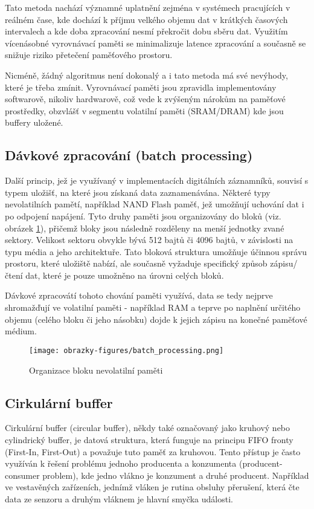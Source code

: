 Tato metoda nachází významné uplatnění zejména v systémech pracujících v reálném čase, kde dochází k příjmu velkého objemu dat 
v krátkých časových intervalech a kde doba zpracování nesmí překročit dobu sběru dat. Využitím vícenásobné vyrovnávací paměti se 
minimalizuje latence zpracování a současně se snižuje riziko přetečení paměťového prostoru. \cite{buffering_chang}

Nicméně, žádný algoritmus není dokonalý a i tato metoda má své nevýhody, které je třeba zmínit. Vyrovnávací paměti jsou zpravidla 
implementovány softwarově, nikoliv hardwarově, což vede k zvýšeným nárokům na paměťové prostředky, obzvlášť v segmentu volatilní 
paměti (SRAM/DRAM) kde jsou buffery uložené. \cite{basics_of_digital_forensics}

\subsection{Dávkové zpracování (batch processing)}
Další princip, jež je využívaný v implementacích digitálních záznamníků, souvisí s typem uložišť, na které jsou získaná data 
zaznamenávána. Některé typy nevolatilních pamětí, například NAND Flash paměť, jež umožňují uchování dat i po odpojení napájení. 
Tyto druhy paměti jsou organizovány do bloků (viz. obrázek \ref{fig:batch-processing}), přičemž bloky jsou následně rozděleny na 
menší jednotky zvané sektory. Velikost sektoru obvykle bývá 512 bajtů či 4096 bajtů, v závislosti na typu média a jeho architektuře. Tato bloková struktura umožňuje účinnou správu prostoru, které uložiště nabízí, ale současně vyžaduje specifický způsob zápisu/čtení dat, které je pouze umožněno na úrovni celých bloků.  \cite{tech_target_nand_flash, non_volatile_memories}

Dávkové zpracovátí tohoto chování paměti využívá, data se tedy nejprve shromažďují ve volatilní paměti - například RAM a teprve po 
naplnění určitého objemu (celého bloku či jeho násobku) dojde k jejich zápisu na konečné paměťové médium.

\begin{figure}[h]
    \centering
    \texttt{[image: obrazky-figures/batch\_processing.png]}
    
    \caption{Organizace bloku nevolatilní paměti \cite{ieee_relationships_among_region_segment_frame_and_cluster}}
    \label{fig:batch-processing}
\end{figure}


\subsection{Cirkulární buffer}
Cirkulární buffer (circular buffer), někdy také označovaný jako kruhový nebo cylindrický buffer, je datová struktura, která 
funguje na principu FIFO fronty (First-In, First-Out) a považuje tuto paměť za kruhovou. Tento přístup je často využíván k řešení 
problému jednoho producenta a konzumenta (producent-consumer problem), kde jedno vlákno je konzument a druhé producent. Například 
ve vestavěných zařízeních, jednímž vláken je rutina obsluhy přerušení, která čte data ze senzoru a druhým vláknem je hlavní smyčka 
události.  \cite{embedjournal_ring_buffer}


